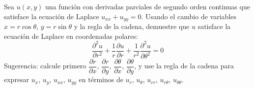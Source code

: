Sea $u(x, y)$ una función con derivadas parciales de segundo orden continuas que satisface la ecuación de Laplace $u_{xx} + u_{yy} = 0$. Usando el cambio de variables $x = r\cos\theta$, $y = r\sin\theta$ y la regla de la cadena, demuestre que $u$ satisface la ecuación de Laplace en coordenadas polares:
\[
\frac{\partial^2 u}{\partial r^2} + \frac{1}{r}\frac{\partial u}{\partial r} + \frac{1}{r^2}\frac{\partial^2 u}{\partial \theta^2} = 0
\]
Sugerencia: calcule primero $\dfrac{\partial r}{\partial x}$, $\dfrac{\partial r}{\partial y}$, $\dfrac{\partial \theta}{\partial x}$, $\dfrac{\partial \theta}{\partial y}$, y use la regla de la cadena para expresar $u_x$, $u_y$, $u_{xx}$, $u_{yy}$ en términos de $u_r$, $u_\theta$, $u_{rr}$, $u_{r\theta}$, $u_{\theta\theta}$.
